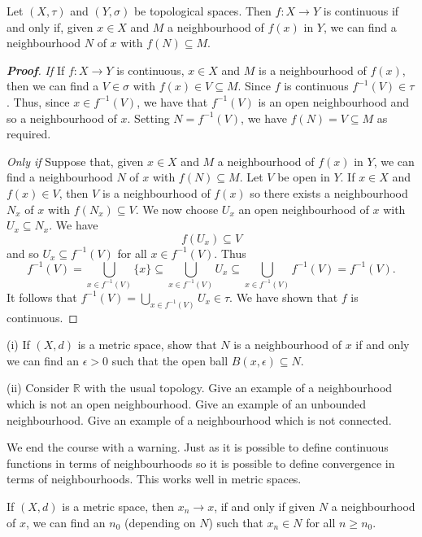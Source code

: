 \begin{lemma}\label{L;continuous via neighbourhood}
Let $(X,\tau)$ and $(Y,\sigma)$ be topological spaces.
Then $f:X\rightarrow Y$ is continuous
if and only if, given $x\in X$ and $M$
a neighbourhood of $f(x)$ in $Y$,
we can find a neighbourhood $N$ of $x$
with $f(N)\subseteq M$.
\end{lemma}
\begin{proof}[\bf Proof]
\noindent\emph{If} If $f:X\rightarrow Y$ is continuous,
$x\in X$ and $M$ is
a neighbourhood of $f(x)$, then we can find
a $V\in\sigma$ with $f(x)\in V\subseteq M$.
Since $f$ is continuous $f^{-1}(V)\in\tau$.
Thus, since $x\in f^{-1}(V)$, we have that $f^{-1}(V)$
is an open neighbourhood and so a neighbourhood of $x$.
Setting $N=f^{-1}(V)$, we have $f(N)=V\subseteq M$
as required.

\vspace{1\baselineskip}

\noindent\emph{Only if} Suppose that,
given $x\in X$ and $M$
a neighbourhood of $f(x)$ in $Y$,
we can find a neighbourhood $N$ of $x$
with $f(N)\subseteq M$.
Let $V$ be open in $Y$. If $x\in X$
and $f(x)\in V$, then $V$ is a neighbourhood
of $f(x)$ so there exists a neighbourhood $N_{x}$
of $x$ with $f(N_{x})\subseteq V$. We now choose
$U_{x}$ an open neighbourhood of $x$ with $U_{x}\subseteq N_{x}$.
We have
\[f(U_{x})\subseteq V\]
and so $U_{x}\subseteq f^{-1}(V)$ for all $x\in f^{-1}(V)$.
Thus
\[f^{-1}(V)=\bigcup_{x\in f^{-1}(V)}\{x\}
\subseteq \bigcup_{x\in f^{-1}(V)}U_{x}
\subseteq \bigcup_{x\in f^{-1}(V)}f^{-1}(V)
=f^{-1}(V).\]
It follows that $f^{-1}(V)=\bigcup_{x\in f^{-1}(V)}U_{x}\in\tau$.
We have shown that $f$ is continuous.
\end{proof}


\begin{problem}\label{E;non-closed neighbourhood}
(i) If $(X,d)$ is a metric space, show that $N$
is a neighbourhood of $x$ if and only we can find an
$\epsilon>0$ such that the open ball
$B(x,\epsilon)\subseteq N$.

(ii) Consider ${\mathbb R}$ with the usual topology.
Give an example of a neighbourhood which is
not an open neighbourhood. Give an example  of
an unbounded neighbourhood. Give an example  of
a neighbourhood which is not connected.
\end{problem}

We end the course with a warning. Just as it is
possible to define continuous functions in terms
of neighbourhoods so it is possible to define convergence
in terms of neighbourhoods.
This works well in metric spaces.
\begin{lemma}\label{L;convergence, neighbourhood, metric}
If $(X,d)$ is a metric space, then $x_{n}\rightarrow x$,
if and only if
given $N$ a neighbourhood of $x$, we can find an
$n_{0}$ (depending on $N$) such that $x_{n}\in N$
for all $n\geq n_{0}$.
\end{lemma}

